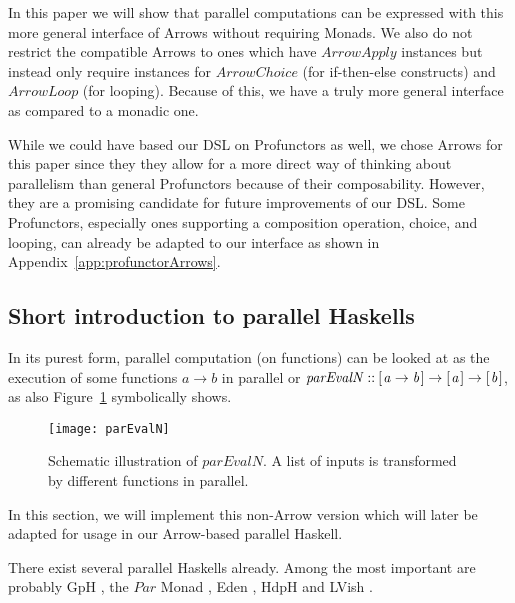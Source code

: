 \documentclass{jfp1}
\newcommand{\Conid}[1]{\mathit{#1}}
\newcommand{\Varid}[1]{\mathit{#1}}
\newcommand{\comm}[2]{}
\newcommand{\mbcomment}[1]{\comm{MB}{#1}}
\begin{document}
In this paper we will show that parallel computations can be expressed with this more general interface of Arrows without requiring Monads. We also do not restrict the compatible Arrows to ones which have \ensuremath{\Conid{ArrowApply}} instances but instead only require instances for \ensuremath{\Conid{ArrowChoice}} (for if-then-else constructs) and \ensuremath{\Conid{ArrowLoop}} (for looping). Because of this, we have a truly more general interface as compared to a monadic one.

While we could have based our DSL on Profunctors as well, we chose Arrows\mbcomment{cite missing?} for this paper since they they allow for a more direct way of thinking about parallelism than general Profunctors because of their composability. However, they are a promising candidate for future improvements of our DSL. Some Profunctors, especially ones supporting a composition operation, choice, and looping, can already be adapted to our interface as shown in Appendix~\ref{app:profunctorArrows}.
	\subsection{Short introduction to parallel Haskells}
\label{sec:parallelHaskells}
\label{sec:parEvalNIntro}
In its purest form, parallel computation (on functions) can be looked at as the execution of some functions \ensuremath{\Varid{a}\to \Varid{b}} in parallel or \ensuremath{\Varid{parEvalN}\mathbin{::}[\mskip1.5mu \Varid{a}\to \Varid{b}\mskip1.5mu]\to [\mskip1.5mu \Varid{a}\mskip1.5mu]\to [\mskip1.5mu \Varid{b}\mskip1.5mu]}, as also Figure~\ref{fig:parEvalN} symbolically shows.
\begin{figure}[t]
  \centering
	\texttt{[image: parEvalN]}
	\caption{Schematic illustration of \ensuremath{\Varid{parEvalN}}. A list of inputs is transformed by different functions in parallel.}
	\label{fig:parEvalN}
\end{figure}

In this section, we will implement this non-Arrow version which will later be adapted for usage in our Arrow-based parallel Haskell.

There exist several parallel Haskells already. Among the most important are probably GpH \citep[based on \ensuremath{\Varid{par}} and \ensuremath{\Varid{pseq}} \enquote{hints},][]{Trinder1996,Trinder1998a}, the \ensuremath{\Conid{Par}} Monad \citep[a monad for deterministic parallelism,][]{par-monad,Foltzer:2012:MPC:2398856.2364562}, Eden \citep[a parallel Haskell for distributed memory,][]{eden,Loogen2012}, HdpH \citep[a Template Haskell-based parallel Haskell for distributed memory,][]{Maier:2014:HDS:2775050.2633363,stewart_maier_trinder_2016} and LVish \citep[a \ensuremath{\Conid{Par}} extension with focus on communication,][]{Kuper:2014:TPE:2666356.2594312}.
\end{document}
